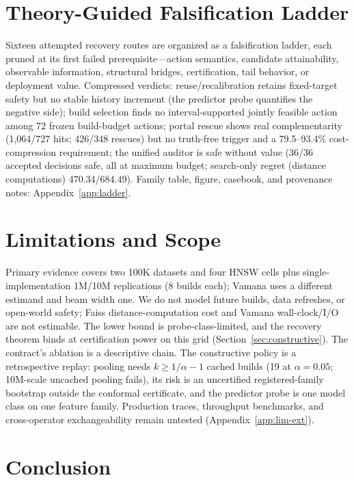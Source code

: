 \documentclass{article}
\begin{document}
\section{Theory-Guided Falsification Ladder}
\label{sec:ladder}

Sixteen attempted recovery routes are organized as a falsification ladder, each pruned at its first
failed prerequisite---action semantics, candidate attainability, observable information, structural
bridges, certification, tail behavior, or deployment value. Compressed verdicts: reuse/recalibration
retains fixed-target safety but no stable history increment (the predictor probe quantifies the negative
side); build selection finds no interval-supported jointly feasible action among 72 frozen
build-budget actions; portal rescue shows real complementarity (1{,}064/727 hits; 426/348 rescues) but no
truth-free trigger and a 79.5--93.4\% cost-compression requirement; the unified auditor is safe without
value (36/36 accepted decisions safe, all at maximum budget; search-only regret (distance computations) 470.34/684.49). Family table, figure,
casebook, and provenance notes: Appendix~\ref{app:ladder}.

\section{Limitations and Scope}
\label{sec:limitations}

Primary evidence covers two 100K datasets and four HNSW cells plus single-implementation 1M/10M
replications (8 builds each); Vamana uses a different estimand and beam width one. We do not model future
builds, data refreshes, or open-world safety; Faiss distance-computation cost and Vamana wall-clock/I/O
are not estimable. The lower bound is probe-class-limited, and the recovery theorem binds at certification power on this
grid (Section~\ref{sec:constructive}).
The contract's ablation is a descriptive chain. The constructive policy is a retrospective replay:
pooling needs $k\ge 1/\alpha-1$ cached builds (19 at $\alpha{=}0.05$; 10M-scale uncached pooling
fails), its risk is an uncertified registered-family bootstrap outside the conformal certificate, and the
predictor probe is one model class on one feature family. Production traces, throughput benchmarks, and cross-operator exchangeability remain untested (Appendix~\ref{app:lim-ext}).

\section{Conclusion}
\label{sec:conclusion}
\end{document}
